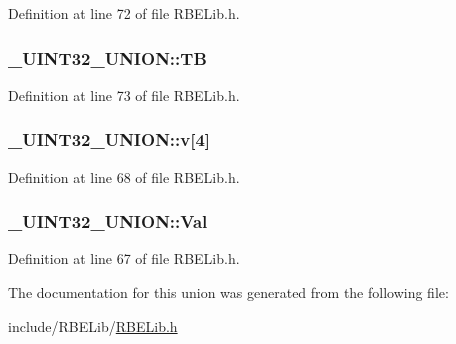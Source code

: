 Definition at line 72 of file R\+B\+E\+Lib.\+h.

\hypertarget{union___u_i_n_t32___u_n_i_o_n_a003631647c4358c166cce519ae617ba8}{
\subsubsection[{T\+B}]{ \+\_\+\+U\+I\+N\+T32\+\_\+\+U\+N\+I\+O\+N\+::\+T\+B}}\label{union___u_i_n_t32___u_n_i_o_n_a003631647c4358c166cce519ae617ba8}


Definition at line 73 of file R\+B\+E\+Lib.\+h.

\hypertarget{union___u_i_n_t32___u_n_i_o_n_aadb5068d7d5639b99483f01440276f7c}{
\subsubsection[{v}]{ \+\_\+\+U\+I\+N\+T32\+\_\+\+U\+N\+I\+O\+N\+::v\mbox{[}4\mbox{]}}}\label{union___u_i_n_t32___u_n_i_o_n_aadb5068d7d5639b99483f01440276f7c}


Definition at line 68 of file R\+B\+E\+Lib.\+h.

\hypertarget{union___u_i_n_t32___u_n_i_o_n_ab75b466902605ee16a8e44ee10db0803}{
\subsubsection[{Val}]{ \+\_\+\+U\+I\+N\+T32\+\_\+\+U\+N\+I\+O\+N\+::\+Val}}\label{union___u_i_n_t32___u_n_i_o_n_ab75b466902605ee16a8e44ee10db0803}


Definition at line 67 of file R\+B\+E\+Lib.\+h.



The documentation for this union was generated from the following file\+:\begin{DoxyCompactItemize}
\item 
include/\+R\+B\+E\+Lib/\hyperlink{_r_b_e_lib_8h}{R\+B\+E\+Lib.\+h}\end{DoxyCompactItemize}
